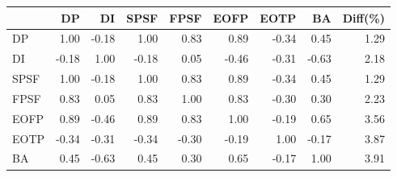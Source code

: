 \begin{tabular}{l|rrrrrrr|r}
\toprule
 & DP & DI & SPSF & FPSF & EOFP & EOTP & BA & Diff(\%)  \\
\midrule
DP & 1.00 & -0.18 & 1.00 & 0.83 & 0.89 & -0.34 & 0.45 & 1.29  \\
DI & -0.18 & 1.00 & -0.18 & 0.05 & -0.46 & -0.31 & -0.63 & 2.18  \\
SPSF & 1.00 & -0.18 & 1.00 & 0.83 & 0.89 & -0.34 & 0.45 & 1.29  \\
FPSF & 0.83 & 0.05 & 0.83 & 1.00 & 0.83 & -0.30 & 0.30 & 2.23  \\
EOFP & 0.89 & -0.46 & 0.89 & 0.83 & 1.00 & -0.19 & 0.65 & 3.56  \\
EOTP & -0.34 & -0.31 & -0.34 & -0.30 & -0.19 & 1.00 & -0.17 & 3.87  \\
BA & 0.45 & -0.63 & 0.45 & 0.30 & 0.65 & -0.17 & 1.00 & 3.91  \\
\bottomrule
\end{tabular}

